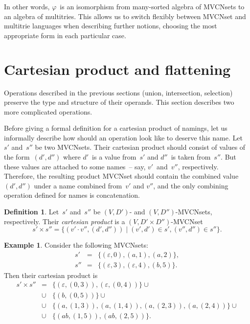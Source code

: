 \documentclass{article}
\theoremstyle{definition}
\newtheorem{Df}{Definition}
\newtheorem{Ex}{Example}
\begin{document}
In other words, $\varphi$~is an isomorphism from many-sorted algebra of
MVCNsets to an algebra of multitries.
This allows us to switch flexibly between MVCNset and multitrie
languages when describing further notions, choosing the most
appropriate form in each particular case.



\section{Cartesian product and flattening}

Operations described in the previous sections (union, intersection, selection)
preserve the type and structure of their operands. This section describes two
more complicated operations.

Before giving a formal definition for a cartesian product of namings, let us
informally describe how should an operation look like to deserve this name.
Let~$s'$ and~$s''$ be two MVCNsets. Their cartesian product should consist of
values of the form~$(d',d'')$ where $d'$~is a value from~$s'$ and $d''$~is taken
from~$s''$. But these values are attached to some names~-- say, $v'$~and~$v''$,
respectively.  Therefore, the resulting product MVCNset should contain the
combined value~$(d',d'')$ under a name combined from~$v'$ and $v''$, and the only
combining operation defined for names is concatenation.

\begin{Df}\label{df:mvcn-cartesian}
Let~$s'$ and~$s''$ be $(V,D')$- and $(V,D'')$-MVCNsets, respectively. Their
\emph{cartesian product} is a $(V,D'\times D'')$-MVCNset
\[
  s'\times s'' = \{ (v'\cdot v'', (d',d'')) \mid (v',d')\in s', (v'',d'')\in s'' \} .
\]
\end{Df}

\begin{Ex}\label{ex:cartesian}
Consider the following MVCNsets:
\begin{eqnarray*}
  s'  & = & \{ (\varepsilon, 0), (a, 1), (a, 2) \} , \\
  s'' & = & \{ (\varepsilon, 3), (\varepsilon, 4), (b, 5) \} .
\end{eqnarray*}
Then their cartesian product is
\begin{eqnarray*}
  s' \times s'' & = &  \{ (\varepsilon, (0, 3)), (\varepsilon, (0, 4)) \} \cup \\
    & \cup & \{ (b, (0, 5)) \} \cup \\
    & \cup & \{ (a, (1, 3)), (a, (1, 4)), (a, (2, 3)), (a, (2, 4)) \} \cup \\
    & \cup & \{ (ab, (1, 5)), (ab, (2, 5)) \} .
\end{eqnarray*}
\end{Ex}
\end{document}
